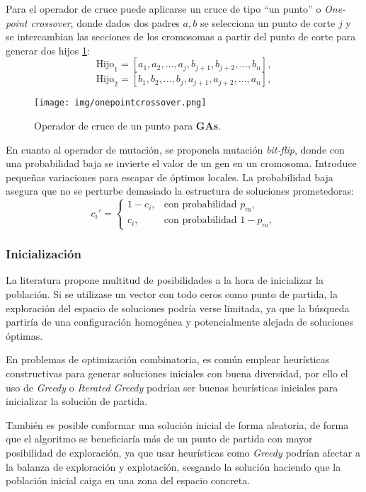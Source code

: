 \documentclass[12pt,letterpaper]{article}
\begin{document}
Para el operador de cruce puede aplicarse un cruce de tipo ``un punto'' o \textit{One-point crossover}, donde dados dos padres $a,b$ se selecciona un punto de corte $j$ y se intercambian las secciones de los cromosomas a partir del punto de corte para generar dos hijos \ref{fig:onepointcrossover}:
\[
\text{Hijo}_1 = [a_1, a_2, \dots, a_j, b_{j+1}, b_{j+2}, \dots, b_n],
\]
\[
\text{Hijo}_2 = [b_1, b_2, \dots, b_j, a_{j+1}, a_{j+2}, \dots, a_n],
\]

\begin{figure}[htp]
    \centering
    \texttt{[image: img/onepointcrossover.png]}
    \caption{Operador de cruce de un punto para \textbf{GAs}.}
    \label{fig:onepointcrossover}
\end{figure}

En cuanto al operador de mutación, se proponela mutación \textit{bit-flip}, donde con una probabilidad baja se invierte el valor de un gen en un cromosoma. Introduce pequeñas variaciones para escapar de óptimos locales. La probabilidad baja asegura que no se perturbe demasiado la estructura de soluciones prometedoras:
\[
c_i' = 
\begin{cases}
1 - c_i, & \text{con probabilidad } p_m, \\
c_i, & \text{con probabilidad } 1 - p_m,
\end{cases}
\]

\subsubsection{Inicialización}
La literatura propone multitud de posibilidades a la hora de inicializar la población. Si se utilizase un vector con todo ceros como punto de partida, la exploración del espacio de soluciones podría verse limitada, ya que la búsqueda partiría de una configuración homogénea y potencialmente alejada de soluciones óptimas.

En problemas de optimización combinatoria, es común emplear heurísticas constructivas para generar soluciones iniciales con buena diversidad, por ello el uso de \textit{Greedy} o \textit{Iterated Greedy} podrían ser buenas heurísticas iniciales para inicializar la solución de partida.

También es posible conformar una solución inicial de forma aleatoria, de forma que el algoritmo se beneficiaría más de un punto de partida con mayor posibilidad de exploración, ya que usar heurísticas como \textit{Greedy} podrían afectar a la balanza de exploración y explotación, sesgando la solución haciendo que la población inicial caiga en una zona del espacio concreta.
\end{document}
